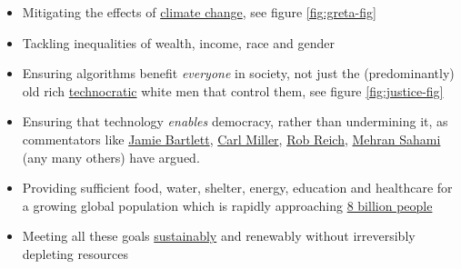 \documentclass[
]{book}
\providecommand{\tightlist}{%
  \setlength{\itemsep}{0pt}\setlength{\parskip}{0pt}}
\begin{document}
\begin{itemize}
\tightlist
\item
  Mitigating the effects of \href{https://en.wikipedia.org/wiki/Climate_change}{climate change}, see figure \ref{fig:greta-fig}
\item
  Tackling inequalities of wealth, income, race and gender \citep{stanley}
\item
  Ensuring algorithms benefit \emph{everyone} in society, not just the (predominantly) old rich \href{https://en.wikipedia.org/wiki/Technocracy}{technocratic} white men that control them, see figure \ref{fig:justice-fig}
\item
  Ensuring that technology \emph{enables} democracy, rather than undermining it, as commentators like \href{https://en.wikipedia.org/wiki/Jamie_Bartlett_(journalist)}{Jamie Bartlett}, \href{https://en.wikipedia.org/wiki/Carl_Miller_(author)}{Carl Miller}, \href{https://en.wikipedia.org/wiki/Rob_Reich}{Rob Reich}, \href{https://en.wikipedia.org/wiki/Mehran_Sahami}{Mehran Sahami} (any many others) have argued. \citep{deathofthegods, bartlett, systemerror}
\item
  Providing sufficient food, water, shelter, energy, education and healthcare for a growing global population which is rapidly approaching \href{https://www.worldometers.info/world-population/}{8 billion people}
\item
  Meeting all these goals \href{https://en.wikipedia.org/wiki/Sustainability}{sustainably} and renewably without irreversibly depleting resources
\end{itemize}
\end{document}
